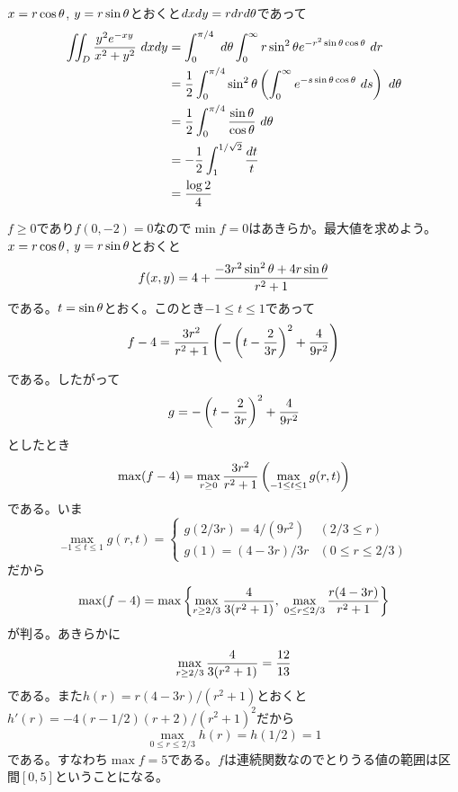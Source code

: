 
\begin{sol}
  $x=r \cos {\theta}$, $y = r\sin {\theta}$とおくと$dx dy = r dr d{\theta}$であって
  \begin{align*}
    \iint_D \frac{y^2 e^{-xy} }{ x^2 + y^2 } \ dx dy &= \int_0^{\pi/4} \ d{\theta} \int_0^{\infty} r \sin^2 {\theta} e^{- r^2 \sin {\theta} \cos {\theta}} \ dr \\
    &= \frac{1}{2} \int_0^{\pi/4} \sin^2 {\theta} \left( \int_0^{\infty}   e^{- s \sin {\theta} \cos {\theta}} \ ds \right) \ d{\theta} \\
    &= \frac{1}{2} \int_0^{\pi/4} \frac{ \sin {\theta} }{\cos {\theta} } \ d{\theta} \\
    &= - \frac{1}{2} \int_1^{1/ \sqrt{2} } \frac{dt}{t} \\
    &= \frac{\log 2}{4}
  \end{align*}
\end{sol}

\newpage

\begin{sol}
  $f \geq 0$であり$f(0,-2) = 0$なので$\min f = 0$はあきらか。最大値を求めよう。$x = r \cos {\theta}$, $y = r \sin {\theta}$とおくと
  \[
  f(x,y) = 4 + \frac{ - 3 r^2 \sin^2 {\theta} + 4r \sin {\theta} }{ r^2 + 1 }
  \]
  である。$t = \sin {\theta}$とおく。このとき$-1 \leq t \leq 1$であって
  \[
  f-4 = \frac{ 3r^2}{r^2 +1} \left( -\left( t - \frac{2}{3r} \right)^2+ \frac{4}{9r^2} \right)
  \]
  である。したがって
  \[
  g = -\left( t - \frac{2}{3r} \right)^2+ \frac{4}{9r^2}
  \]
  としたとき
  \[
  \max (f -4) = \max_{r \geq 0} \frac{ 3r^2}{r^2 +1} \left( \max_{-1 \leq t \leq 1} g(r,t) \right)
  \]
  である。いま
  \[
  \max_{-1 \leq t \leq 1} g(r,t) = \begin{cases}
  g(2/3r) = 4/(9r^2) &(2/3 \leq r) \\
  g(1) = (4-3r)/3r &(0 \leq r \leq 2/3)
\end{cases}
  \]
  だから
  \[
  \max (f-4) = \max \left\{  \max_{r \geq 2/3} \frac{4}{3(r^2 + 1)} , \; \max_{0 \leq r \leq 2/3} \frac{r(4-3r)}{r^2+1} \right\}
  \]
  が判る。あきらかに
  \[
  \max_{r \geq 2/3} \frac{4}{3(r^2 + 1)} = \frac{12}{13}
  \]
である。また$h(r) = r(4-3r)/ (r^2+1)$とおくと$h'(r) = -4(r - 1/2)(r+2)/ (r^2 + 1)^2 $だから
\[
\max_{0 \leq r \leq 2/3} h(r) = h(1/2) =1
\]
である。すなわち$\max f = 5$である。$f$は連続関数なのでとりうる値の範囲は区間$[0, 5]$ということになる。
\end{sol}


